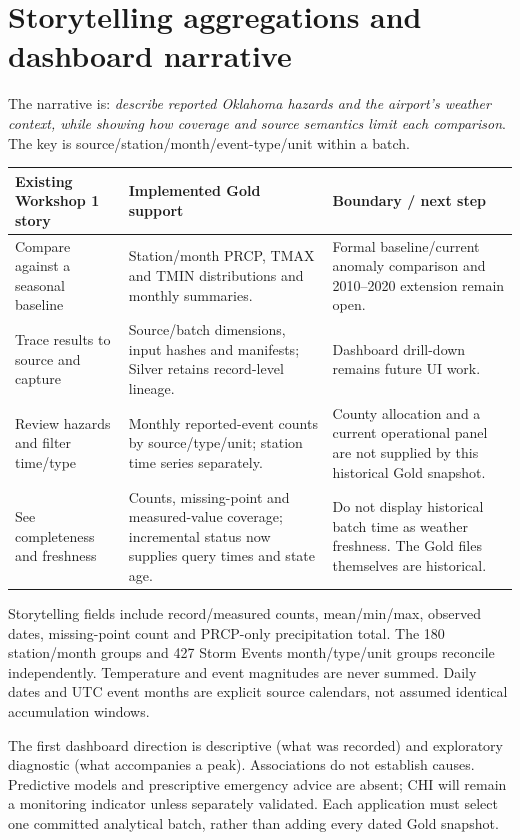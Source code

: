 \documentclass[10pt]{article}
\begin{document}
\section{Storytelling aggregations and dashboard narrative}
The narrative is: \emph{describe reported Oklahoma hazards and the airport's
weather context, while showing how coverage and source semantics limit each
comparison}. The key is source/station/month/event-type/unit within a batch.
\begin{tabularx}{\textwidth}{L{4.0cm}YY}
\toprule Existing Workshop 1 story & Implemented Gold support & Boundary / next step\\\midrule
Compare against a seasonal baseline & Station/month PRCP, TMAX and TMIN distributions and monthly summaries. & Formal baseline/current anomaly comparison and 2010--2020 extension remain open.\\
Trace results to source and capture & Source/batch dimensions, input hashes and manifests; Silver retains record-level lineage. & Dashboard drill-down remains future UI work.\\
Review hazards and filter time/type & Monthly reported-event counts by source/type/unit; station time series separately. & County allocation and a current operational panel are not supplied by this historical Gold snapshot.\\
See completeness and freshness & Counts, missing-point and measured-value coverage; incremental status now supplies query times and state age. & Do not display historical batch time as weather freshness. The Gold files themselves are historical.\\
\bottomrule
\end{tabularx}

Storytelling fields include record/measured counts, mean/min/max, observed dates,
missing-point count and PRCP-only precipitation total. The 180 station/month
groups and 427 Storm Events month/type/unit groups reconcile independently.
Temperature and event magnitudes are never summed. Daily dates and UTC event
months are explicit source calendars, not assumed identical accumulation windows.

The first dashboard direction is descriptive (what was recorded) and exploratory
diagnostic (what accompanies a peak). Associations do not establish causes.
Predictive models and prescriptive emergency advice are absent; CHI will remain
a monitoring indicator unless separately validated. Each application must select
one committed analytical batch, rather than adding every dated Gold snapshot.
\end{document}
